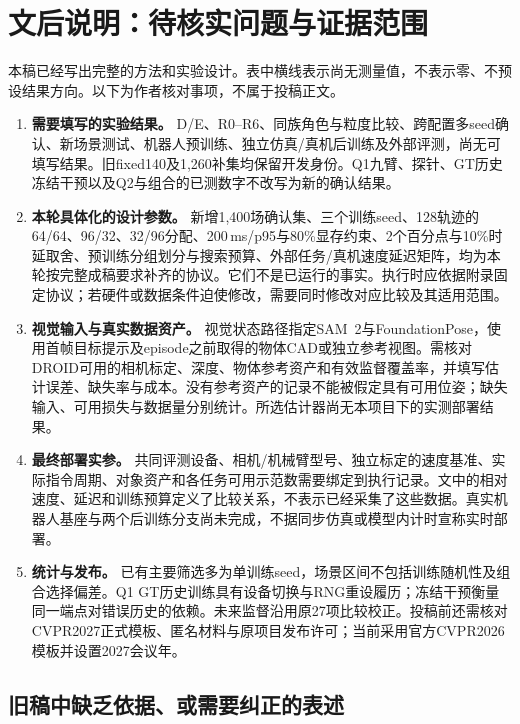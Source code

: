 \section*{文后说明：待核实问题与证据范围}

本稿已经写出完整的方法和实验设计。表中横线表示尚无测量值，不表示零、不预设结果方向。以下为作者核对事项，不属于投稿正文。

\begin{enumerate}
\item \textbf{需要填写的实验结果。}
D/E、R0--R6、同族角色与粒度比较、跨配置多seed确认、新场景测试、机器人预训练、独立仿真/真机后训练及外部评测，尚无可填写结果。旧fixed140及1,260补集均保留开发身份。Q1九臂、探针、GT历史冻结干预以及Q2与组合的已测数字不改写为新的确认结果。

\item \textbf{本轮具体化的设计参数。}
新增1,400场确认集、三个训练seed、128轨迹的64/64、96/32、32/96分配、200\,ms/p95与80\%显存约束、2个百分点与10\%时延取舍、预训练分组划分与搜索预算、外部任务/真机速度延迟矩阵，均为本轮按完整成稿要求补齐的协议。它们不是已运行的事实。执行时应依据附录固定协议；若硬件或数据条件迫使修改，需要同时修改对应比较及其适用范围。

\item \textbf{视觉输入与真实数据资产。}
视觉状态路径指定SAM~2与FoundationPose，使用首帧目标提示及episode之前取得的物体CAD或独立参考视图。需核对DROID可用的相机标定、深度、物体参考资产和有效监督覆盖率，并填写估计误差、缺失率与成本。没有参考资产的记录不能被假定具有可用位姿；缺失输入、可用损失与数据量分别统计。所选估计器尚无本项目下的实测部署结果。

\item \textbf{最终部署实参。}
共同评测设备、相机/机械臂型号、独立标定的速度基准、实际指令周期、对象资产和各任务可用示范数需要绑定到执行记录。文中的相对速度、延迟和训练预算定义了比较关系，不表示已经采集了这些数据。真实机器人基座与两个后训练分支尚未完成，不据同步仿真或模型内计时宣称实时部署。

\item \textbf{统计与发布。}
已有主要筛选多为单训练seed，场景区间不包括训练随机性及组合选择偏差。Q1 GT历史训练具有设备切换与RNG重设履历；冻结干预衡量同一端点对错误历史的依赖。未来监督沿用原27项比较校正。投稿前还需核对CVPR2027正式模板、匿名材料与原项目发布许可；当前采用官方CVPR2026模板并设置2027会议年。
\end{enumerate}

\subsection*{旧稿中缺乏依据、或需要纠正的表述}

